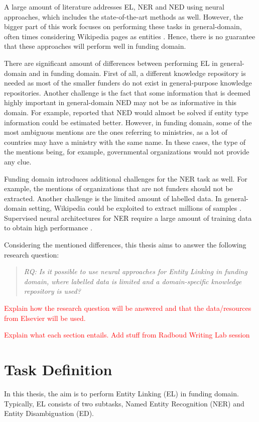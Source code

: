 \documentclass{article}
\theoremstyle{definition}
\theoremstyle{remark}
\begin{document}
A large amount of literature addresses EL, NER and NED using neural approaches, which includes the state-of-the-art methods \cite{REL,LUKE,mulang} as well. However, the bigger part of this work focuses on performing these tasks in general-domain, often times considering Wikipedia pages as entities \cite{nlpnotes}. Hence, there is no guarantee that these approaches will perform well in funding domain.

There are significant amount of differences between performing EL in general-domain and in funding domain. First of all, a different knowledge repository is needed as most of the smaller funders do not exist in general-purpose knowledge repositories.  Another challenge is the fact that some information that is deemed highly important in general-domain NED may not be as informative in this domain. For example, \cite{raiman} reported that NED would almost be solved if entity type information could be estimated better. However, in funding domain, some of the most ambiguous mentions are the ones referring to ministries, as a lot of countries may have a ministry with the same name. In these cases, the type of the mentions being, for example, governmental organizations would not provide any clue. 

Funding domain introduces additional challenges for the NER task as well. For example, the mentions of organizations that are not funders should not be extracted. Another challenge is the limited amount of labelled data. In general-domain setting, Wikipedia could be exploited to extract millions of samples \cite{bunescu-pasca-2006-using}. Supervised neural architectures for NER require a large amount of training data to obtain high performance \cite{NERsurvey}.

Considering the mentioned differences, this thesis aims to answer the following research question:

\begin{quote}\emph{RQ: Is it possible to use neural approaches for Entity Linking in funding domain, where labelled data is limited and a domain-specific knowledge repository is used?}\end{quote}

\textcolor{red}{Explain how the research question will be answered and that the data/resources from Elsevier will be used.}

\textcolor{red}{Explain what each section entails.}
\textcolor{red}{Add stuff from Radboud Writing Lab session}

\newpage
\section{Task Definition}
In this thesis, the aim is to perform Entity Linking (EL) in funding domain. Typically, EL consists of two subtasks, Named Entity Recognition (NER) and Entity Disambiguation (ED).
\end{document}

